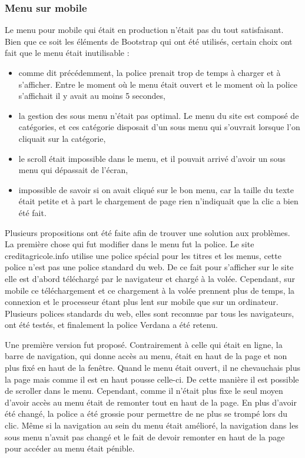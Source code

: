 \documentclass[12pt,a4paper]{article}
\begin{document}
\subsubsection{Menu sur mobile}
Le menu pour mobile qui était en production n'était pas du tout satisfaisant.\\
Bien que ce soit les éléments de Bootstrap qui ont été utilisés, certain choix ont fait que le menu était inutilisable : 
\begin{itemize}
\item comme dit précédemment, la police prenait trop de temps à charger et à s'afficher. Entre le moment où le menu était ouvert et le moment où la police s'affichait il y avait au moins 5 secondes,
\item la gestion des sous menu n'était pas optimal. Le menu du site est composé de catégories, et ces catégorie disposait d'un sous menu qui s'ouvrait lorsque l'on cliquait sur la catégorie,
\item le scroll était impossible dans le menu, et il pouvait arrivé d'avoir un sous menu qui dépassait de l'écran,
\item impossible de savoir si on avait cliqué sur le bon menu, car la taille du texte était petite et à part le chargement de page rien n'indiquait que la clic a bien été fait.
\end{itemize}\par 
Plusieurs propositions ont été faite afin de trouver une solution aux problèmes. La première chose qui fut modifier dans le menu fut la police. Le site creditagricole.info utilise une police spécial pour les titres et les menus, cette police n'est pas une police standard du web. De ce fait pour s'afficher sur le site elle est d'abord téléchargé par le navigateur et chargé à la volée. Cependant, sur mobile ce téléchargement et ce chargement à la volée prennent plus de temps, la connexion et le processeur étant plus lent sur mobile que sur un ordinateur. Plusieurs polices standards du web, elles sont reconnue par tous les navigateurs, ont été testés, et finalement la police Verdana a été retenu.\par
Une première version fut proposé. Contrairement à celle qui était en ligne, la barre de navigation, qui donne accès au menu, était en haut de la page et non plus fixé en haut de la fenêtre. Quand le menu était ouvert, il ne chevauchais plus la page mais comme il est en haut pousse celle-ci. De cette manière il est possible de scroller dans le menu. Cependant, comme il n'était plus fixe le seul moyen d'avoir accès au menu était de remonter tout en haut de la page. En plus d'avoir été changé, la police a été grossie pour permettre de ne plus se trompé lors du clic. Même si la navigation au sein du menu était amélioré, la navigation dans les sous menu n'avait pas changé et le fait de devoir remonter en haut de la page pour accéder au menu était pénible.\par
\end{document}
